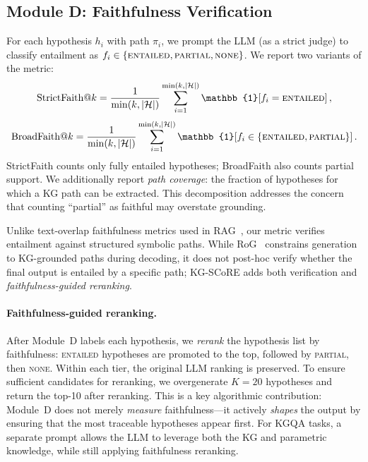 \subsection{Module D: Faithfulness Verification}
\label{sec:method:d}

For each hypothesis $h_i$ with path $\pi_i$, we prompt the LLM (as a strict judge) to classify entailment as $f_i\in\{\textsc{entailed},\textsc{partial},\textsc{none}\}$. We report two variants of the metric:
\begin{equation}
  \label{eq:faith_strict}
  \mathrm{StrictFaith}@k = \frac{1}{\min(k,|\mathcal{H}|)}\sum_{i=1}^{\min(k,|\mathcal{H}|)} \mathbb{1}\!\left[f_i=\textsc{entailed}\right],
\end{equation}
\begin{equation}
  \label{eq:faith_broad}
  \mathrm{BroadFaith}@k = \frac{1}{\min(k,|\mathcal{H}|)}\sum_{i=1}^{\min(k,|\mathcal{H}|)} \mathbb{1}\!\left[f_i\in\{\textsc{entailed},\textsc{partial}\}\right].
\end{equation}
StrictFaith counts only fully entailed hypotheses; BroadFaith also counts partial support. We additionally report \emph{path coverage}: the fraction of hypotheses for which a KG path can be extracted. This decomposition addresses the concern that counting ``partial'' as faithful may overstate grounding.

Unlike text-overlap faithfulness metrics used in RAG~\cite{brown2025systematic}, our metric verifies entailment against structured symbolic paths. While RoG~\cite{luo2024graphconstrained} constrains generation to KG-grounded paths during decoding, it does not post-hoc verify whether the final output is entailed by a specific path; KG-SCoRE adds both verification and \emph{faithfulness-guided reranking}.

\paragraph{Faithfulness-guided reranking.}
After Module~D labels each hypothesis, we \emph{rerank} the hypothesis list by faithfulness: \textsc{entailed} hypotheses are promoted to the top, followed by \textsc{partial}, then \textsc{none}. Within each tier, the original LLM ranking is preserved. To ensure sufficient candidates for reranking, we overgenerate $K{=}20$ hypotheses and return the top-10 after reranking. This is a key algorithmic contribution: Module~D does not merely \emph{measure} faithfulness---it actively \emph{shapes} the output by ensuring that the most traceable hypotheses appear first. For KGQA tasks, a separate prompt allows the LLM to leverage both the KG and parametric knowledge, while still applying faithfulness reranking.

